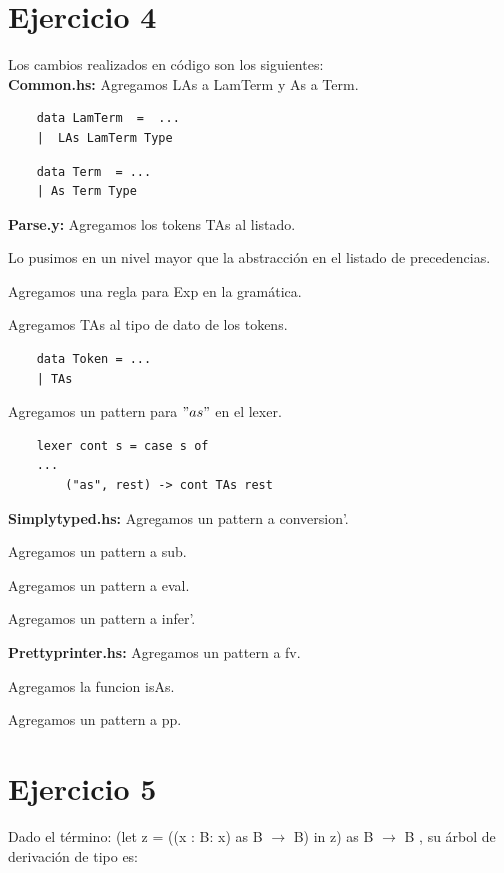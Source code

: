 \documentclass{article}
\begin{document}
	\section*{Ejercicio 4}
	Los cambios realizados en código son los siguientes:\\
	\textbf{Common.hs:} Agregamos LAs a LamTerm y As a Term.
	\begin{lstlisting}
	data LamTerm  =  ...
	|  LAs LamTerm Type
	\end{lstlisting}
	\begin{lstlisting}
	data Term  = ...
	| As Term Type
	\end{lstlisting}
	\textbf{Parse.y:} Agregamos los tokens TAs al listado. 
	
	Lo pusimos en un nivel mayor que la abstracción en el listado de precedencias. 
	
	Agregamos una regla para Exp en la gramática. 
	
	Agregamos TAs al tipo de dato de los tokens. 
	\begin{lstlisting}
	data Token = ...
	| TAs
	\end{lstlisting}
	Agregamos un pattern para $"as"$ en el lexer.
	\begin{lstlisting}
	lexer cont s = case s of
	...
	    ("as", rest) -> cont TAs rest\end{lstlisting}
	\textbf{Simplytyped.hs:} Agregamos un pattern a conversion'.
	
	Agregamos un pattern a sub.
	
	Agregamos un pattern a eval.
	
	Agregamos un pattern a infer'.
	
	\textbf{Prettyprinter.hs:} Agregamos un pattern a fv.
	
	Agregamos la funcion isAs.
	
	Agregamos un pattern a pp.
	
	\newpage
	\section*{Ejercicio 5}
	Dado el término: (let z = ((x : B: x) as B $\rightarrow$ B) in z) as B $\rightarrow$ B
	, su árbol de derivación de tipo es:
	
\end{document}
